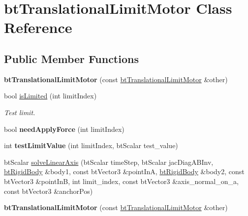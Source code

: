 \hypertarget{classbtTranslationalLimitMotor}{}\section{bt\+Translational\+Limit\+Motor Class Reference}
\label{classbtTranslationalLimitMotor}
\subsection*{Public Member Functions}
\begin{DoxyCompactItemize}
\item 
\mbox{\label{classbtTranslationalLimitMotor_ad06b8b53ab20a22ec33b091e42eea822}} 
{\bfseries bt\+Translational\+Limit\+Motor} (const \hyperlink{classbtTranslationalLimitMotor}{bt\+Translational\+Limit\+Motor} \&other)
\item 
bool \hyperlink{classbtTranslationalLimitMotor_ae5bb30b955dcd0923d72642e37f00622}{is\+Limited} (int limit\+Index)
\begin{DoxyCompactList}\small\item\em Test limit. \end{DoxyCompactList}\item 
\mbox{\label{classbtTranslationalLimitMotor_a635a5c4078ef1b5a8fa171071843b62f}} 
bool {\bfseries need\+Apply\+Force} (int limit\+Index)
\item 
\mbox{\label{classbtTranslationalLimitMotor_a74698c3a1b13a97371fd1eff60201f3a}} 
int {\bfseries test\+Limit\+Value} (int limit\+Index, bt\+Scalar test\+\_\+value)
\item 
bt\+Scalar \hyperlink{classbtTranslationalLimitMotor_a40857b3a98cd8d8fc986516985726e49}{solve\+Linear\+Axis} (bt\+Scalar time\+Step, bt\+Scalar jac\+Diag\+A\+B\+Inv, \hyperlink{classbtRigidBody}{bt\+Rigid\+Body} \&body1, const bt\+Vector3 \&point\+InA, \hyperlink{classbtRigidBody}{bt\+Rigid\+Body} \&body2, const bt\+Vector3 \&point\+InB, int limit\+\_\+index, const bt\+Vector3 \&axis\+\_\+normal\+\_\+on\+\_\+a, const bt\+Vector3 \&anchor\+Pos)
\item 
\mbox{\label{classbtTranslationalLimitMotor_ad06b8b53ab20a22ec33b091e42eea822}} 
{\bfseries bt\+Translational\+Limit\+Motor} (const \hyperlink{classbtTranslationalLimitMotor}{bt\+Translational\+Limit\+Motor} \&other)

\end{DoxyCompactItemize}
